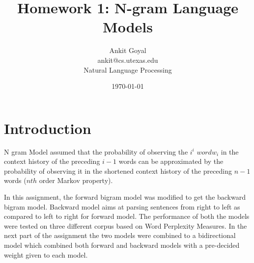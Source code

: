 \documentclass[10pt] {article}
\author{Ankit Goyal \\ankit@cs.utexas.edu \\ Natural Language Processing}
\title{Homework 1: N-gram Language Models}
\date{\today}
\begin{document}
\maketitle


\section{Introduction}
N gram Model assumed that the probability of observing the $i^{i}$ $word w_{i}$ in the context history of the preceding $i - 1$ words can be approximated by the probability of observing it in the shortened context history of the preceding $n - 1$ words ($nth$ order Markov property).

In this assignment, the forward bigram model was modified to get the backward bigram model. Backward model aims at parsing sentences from right to left as compared to left to right for forward model. The performance of both the models were tested on three different corpus based on Word Perplexity Measures. In the next part of the assignment the two models were combined to a bidirectional model which combined both forward and backward models with a pre-decided weight given to each model. 
\end{document}
